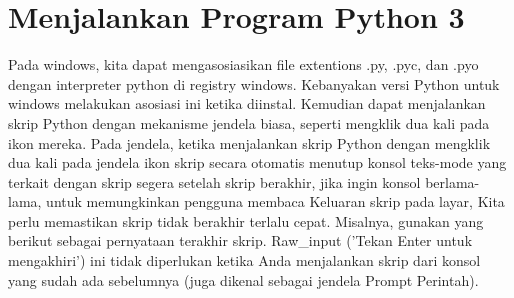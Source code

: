 \documentclass[12pt, times new roman, a4paper]{article}
\begin{document}
\section{Menjalankan Program Python 3}
Pada windows, kita dapat mengasosiasikan file extentions .py, .pyc, dan .pyo dengan interpreter python di registry windows. Kebanyakan versi Python untuk windows melakukan asosiasi ini ketika diinstal. Kemudian dapat menjalankan skrip Python dengan mekanisme jendela biasa, seperti mengklik dua kali pada ikon mereka. Pada jendela, ketika menjalankan skrip Python dengan mengklik dua kali pada jendela ikon skrip secara otomatis menutup konsol teks-mode yang terkait dengan skrip segera setelah skrip berakhir, jika ingin konsol berlama-lama, untuk memungkinkan pengguna membaca Keluaran skrip pada layar, Kita perlu memastikan skrip tidak berakhir terlalu cepat. Misalnya, gunakan yang berikut sebagai pernyataan terakhir skrip. Raw_input ('Tekan Enter untuk mengakhiri') ini tidak diperlukan ketika Anda menjalankan skrip dari konsol yang sudah ada sebelumnya (juga dikenal sebagai jendela Prompt Perintah).
\end{document}
